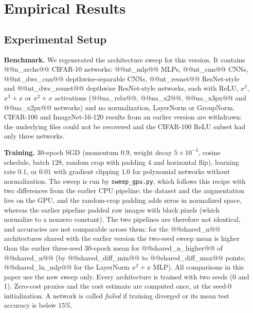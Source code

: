 \section{Empirical Results}
\label{sec:results}

\subsection{Experimental Setup}
\label{sec:setup}

\textbf{Benchmark.}  We regenerated the architecture sweep for this version.  It contains @@n_archs@@ CIFAR-10 networks:
@@nt_mlp@@ MLPs, @@nt_cnn@@ CNNs, @@nt_dws_cnn@@ depthwise-separable CNNs, @@nt_resnet@@ ResNet-style and @@nt_dws_resnet@@ depthwise ResNet-style networks,
each with ReLU, $x^2$, $x^3{+}x$ or $x^2{+}x$ activations (@@na_relu@@, @@na_x2@@, @@na_x3px@@ and @@na_x2px@@ networks) and no normalization, LayerNorm or GroupNorm.
CIFAR-100 and ImageNet-16-120 results from an earlier version are withdrawn: the underlying files could not be recovered
and the CIFAR-100 ReLU subset had only three networks.

\textbf{Training.}  30-epoch SGD (momentum $0.9$, weight decay $5{\times}10^{-4}$, cosine schedule, batch $128$, random crop with padding $4$
and horizontal flip), learning rate $0.1$, or $0.01$ with gradient clipping $1.0$ for polynomial networks without normalization.  The sweep is
run by \texttt{sweep\_gpu.py}, which follows this recipe with two differences from the earlier CPU pipeline: the dataset and the augmentation live on the GPU, and the random-crop padding
adds zeros in normalized space, whereas the earlier pipeline padded raw images with black pixels (which normalize to a nonzero constant).  The two pipelines are therefore not identical, and
accuracies are not comparable across them: for the @@shared_n@@ architectures shared with the earlier version the two-seed sweep mean is higher than the earlier three-seed 30-epoch mean for
@@shared_n_higher@@ of @@shared_n@@ (by @@shared_diff_min@@ to @@shared_diff_max@@ points; @@shared_ln_mlp@@ for the LayerNorm $x^2{+}x$ MLP).  All comparisons in this paper use the new sweep only.  Every architecture is trained with two seeds (0 and 1).  Zero-cost proxies and the cost estimate are computed
once, at the seed-0 initialization.  A network is called \emph{failed} if training diverged or its mean test accuracy is below $15\%$.

